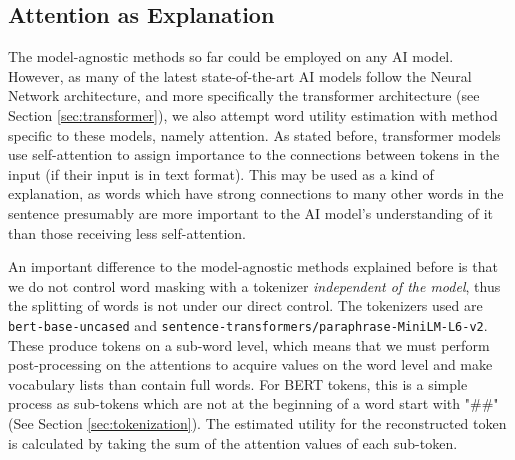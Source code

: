 \subsection{Attention as Explanation}
The model-agnostic methods so far could be employed on any AI model.
However, as many of the latest state-of-the-art AI models follow the Neural Network architecture, and more specifically the transformer architecture (see Section \ref{sec:transformer}), we also attempt word utility estimation with method specific to these models, namely attention.
As stated before, transformer models use self-attention to assign importance to the connections between tokens in the input (if their input is in text format).
This may be used as a kind of explanation, as words which have strong connections to many other words in the sentence presumably are more important to the AI model's understanding of it than those receiving less self-attention.

An important difference to the model-agnostic methods explained before is that we do not control word masking with a tokenizer \textit{independent of the model}, thus the splitting of words is not under our direct control.
The tokenizers used are \texttt{bert-base-uncased} and \texttt{sentence-transformers/paraphrase-MiniLM-L6-v2}.
These produce tokens on a sub-word level, which means that we must perform post-processing on the attentions to acquire values on the word level and make vocabulary lists than contain full words.
For BERT tokens, this is a simple process as sub-tokens which are not at the beginning of a word start with "\#\#" (See Section \ref{sec:tokenization}).
The estimated utility for the reconstructed token is calculated by taking the sum of the attention values of each sub-token.

